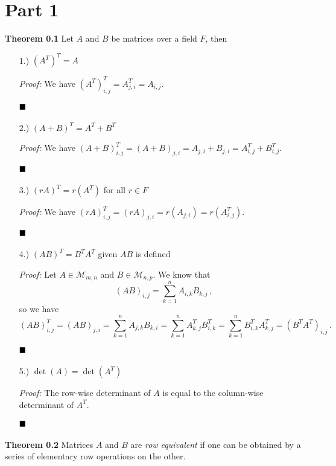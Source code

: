 \documentclass[12pt]{article}
\newcommand{\done}{
    \ensuremath{\strut\hfill\blacksquare}
}
\newcommand{\parens}[1]{
    \left(#1\right)
}
\begin{document}

    \setlength{\parindent}{0in}

    \pagestyle{fancy}
    
    \section*{Part 1}

    \textbf{Theorem 0.1} Let $A$ and $B$ be matrices over a field $F$, then

    \begin{itemize}
        \item [1.)] $(A^T)^T=A$

        \textit{Proof:} We have $(A^T)^T_{i,j}=A^T_{j,i}=A_{i,j}$.
        \done

        \item [2.)] $(A+B)^T=A^T+B^T$
        
        \textit{Proof:} We have
        $(A+B)^T_{i,j}=(A+B)_{j,i}=A_{j,i}+B_{j,i}=A^T_{i,j}+B^T_{i,j}$.
        \done

        \item [3.)] $(rA)^T=r(A^T)$ for all $r\in F$

        \textit{Proof:} We have $(rA)^T_{i,j}
            = (rA)_{j,i}=r(A_{j,i})
            = r(A^T_{i,j})$.
        \done

        \item [4.)] $(AB)^T = B^TA^T$ given $AB$ is defined

        \textit{Proof:} Let $A \in \mathcal{M}_{m,n}$ and
        $B \in \mathcal{M}_{n,p}$.
        We know that
        \[
            (AB)_{i,j}
            = \sum_{k=1}^n A_{i,k} B_{k,j}
            \, ,
        \]
        so we have
        \[
            (AB)^T_{i,j}
            = (AB)_{j,i}
            = \sum_{k=1}^n A_{j,k} B_{k,i}
            = \sum_{k=1}^n A^T_{k,j} B^T_{i,k}
            = \sum_{k=1}^n B^T_{i,k} A^T_{k,j}
            = \parens{B^TA^T}_{i,j}
            \, .
        \]
        \done

        \item [5.)] $\det(A)=\det(A^T)$

        \textit{Proof:} The row-wise determinant of $A$ is equal
        to the column-wise determinant of $A^T$.
        \done
    \end{itemize}

    \textbf{Theorem 0.2} Matrices $A$ and $B$ are \textit{row equivalent} if
    one can be obtained by a series of elementary row operations on the other.
\end{document}
